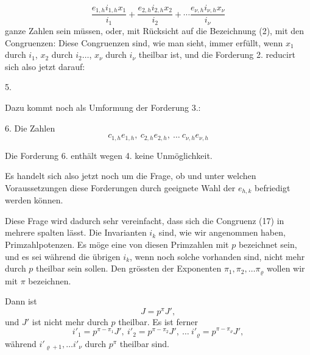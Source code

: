 \[
\frac{e_{1,h}i_{1,h}x_1}{i_1} + \frac{e_{2,h}i_{2,h}x_2}{i_2} + \cdots \frac{e_{\nu,h}i_{\nu,h}x_\nu}{i_\nu}
\]
ganze Zahlen sein müssen, oder, mit Rücksicht auf die Bezeichnung (2), mit den Congruenzen:
Diese Congruenzen sind, wie man sieht, immer erfüllt, wenn
$x_1$ durch $i_1$, $x_2$ durch $i_2 \dots$, $x_\nu$ durch $i_\nu$ theilbar ist, und die
Forderung 2. reducirt sich also jetzt darauf:

    5. 

    Dazu kommt noch als Umformung der Forderung 3.:

    6. Die Zahlen
\[
c_{1,h}e_{1,h},\ c_{2,h}e_{2,h},\ \dots\ c_{\nu,h}e_{\nu,h}
\]

    Die Forderung 6. enthält wegen 4. keine Unmöglichkeit.


    Es handelt sich also jetzt noch um die Frage, ob und unter welchen Voraussetzungen diese Forderungen durch geeignete Wahl der $e_{h,k}$ befriedigt werden können.

    Diese Frage wird dadurch sehr vereinfacht, dass sich die
Congruenz (17) in mehrere spalten lässt. Die Invarianten $i_k$
sind, wie wir angenommen haben, Primzahlpotenzen. Es möge
eine von diesen Primzahlen mit $p$ bezeichnet sein, und es sei
während die übrigen $i_k$, wenn noch solche vorhanden sind, nicht
mehr durch $p$ theilbar sein sollen. Den grössten der Exponenten $\pi_1, \pi_2, \dots \pi_\varrho$ wollen wir mit $\pi$ bezeichnen.

    Dann ist
\[
J = p^\pi J',
\]
und $J'$ ist nicht mehr durch $p$ theilbar. Es ist ferner
\[
i'_1 = p^{\pi-\pi_1}J',\ i'_2 = p^{\pi-\pi_2}J',\ \dots\ i'_\varrho = p^{\pi-\pi_\varrho}J',
\]
während $i'_{\varrho+1}, \dots i'_\nu$ durch $p^\pi$ theilbar sind.
